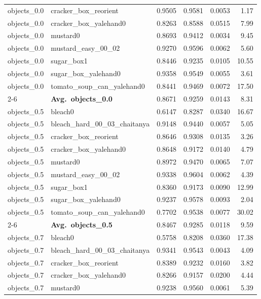 \begin{longtable}{llrrrr}
  objects_0.0 & cracker\_box\_reorient & 0.9505 & 0.9581 & 0.0053 & 1.17 \\
  objects_0.0 & cracker\_box\_yalehand0 & 0.8263 & 0.8588 & 0.0515 & 7.99 \\
  objects_0.0 & mustard0 & 0.8693 & 0.9412 & 0.0034 & 9.45 \\
  objects_0.0 & mustard\_easy\_00\_02 & 0.9270 & 0.9596 & 0.0062 & 5.60 \\
  objects_0.0 & sugar\_box1 & 0.8446 & 0.9235 & 0.0105 & 10.55 \\
  objects_0.0 & sugar\_box\_yalehand0 & 0.9358 & 0.9549 & 0.0055 & 3.61 \\
  objects_0.0 & tomato\_soup\_can\_yalehand0 & 0.8441 & 0.9469 & 0.0072 & 17.50 \\
  \cmidrule{2-6}
  & \textbf{Avg.~objects_0.0} & 0.8671 & 0.9259 & 0.0143 & 8.31 \\
  \midrule
  objects_0.5 & bleach0 & 0.6147 & 0.8287 & 0.0340 & 16.67 \\
  objects_0.5 & bleach\_hard\_00\_03\_chaitanya & 0.9148 & 0.9440 & 0.0057 & 5.05 \\
  objects_0.5 & cracker\_box\_reorient & 0.8646 & 0.9308 & 0.0135 & 3.26 \\
  objects_0.5 & cracker\_box\_yalehand0 & 0.8648 & 0.9172 & 0.0140 & 4.79 \\
  objects_0.5 & mustard0 & 0.8972 & 0.9470 & 0.0065 & 7.07 \\
  objects_0.5 & mustard\_easy\_00\_02 & 0.9338 & 0.9604 & 0.0062 & 4.39 \\
  objects_0.5 & sugar\_box1 & 0.8360 & 0.9173 & 0.0090 & 12.99 \\
  objects_0.5 & sugar\_box\_yalehand0 & 0.9237 & 0.9578 & 0.0093 & 2.04 \\
  objects_0.5 & tomato\_soup\_can\_yalehand0 & 0.7702 & 0.9538 & 0.0077 & 30.02 \\
  \cmidrule{2-6}
  & \textbf{Avg.~objects_0.5} & 0.8467 & 0.9285 & 0.0118 & 9.59 \\
  \midrule
  objects_0.7 & bleach0 & 0.5758 & 0.8208 & 0.0360 & 17.38 \\
  objects_0.7 & bleach\_hard\_00\_03\_chaitanya & 0.9341 & 0.9543 & 0.0043 & 4.09 \\
  objects_0.7 & cracker\_box\_reorient & 0.8389 & 0.9232 & 0.0160 & 3.82 \\
  objects_0.7 & cracker\_box\_yalehand0 & 0.8266 & 0.9157 & 0.0200 & 4.44 \\
  objects_0.7 & mustard0 & 0.9238 & 0.9560 & 0.0061 & 5.39 \\

\end{longtable}
